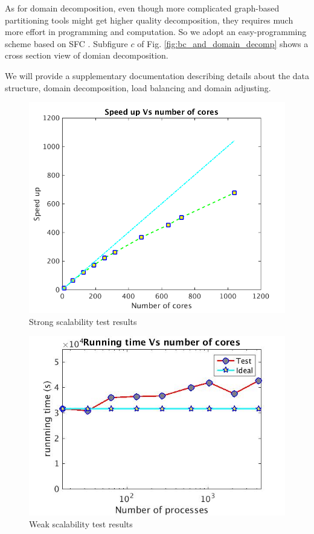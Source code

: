 \documentclass[journal abbreviation, manuscript]{copernicus}
\begin{document}
As for domain decomposition, even though more complicated graph-based partitioning tools \citep {biswas1999experiments} might get higher quality decomposition, they requires much more effort in programming and computation. So we adopt an easy-programming scheme based on SFC \citep {patra1999efficient}. Subfigure $c$ of Fig. \ref{fig:bc_and_domain_decomp} shows a cross section view of domian decomposition.

We will provide a supplementary documentation describing details about the data structure, domain decomposition, load balancing and domain adjusting.

\begin{figure}[!t]
\centering
\includegraphics[scale=0.35]{strong}
\caption{Strong scalability test results}
\label{fig:strong_scale}
\end{figure}

\begin{figure}[!t]
\centering
\includegraphics[scale=0.35]{weak_scale}
\caption{Weak scalability test results}
\label{fig:weak_scale}
\end{figure}
\end{document}
